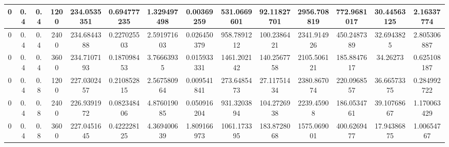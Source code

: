 \documentclass[main.tex]{subfiles}
\begin{document}
\begin{table}[ht]
\begin{tabular}{cccccccccccccc}
		\multicolumn{1}{|c|}{0}  & \multicolumn{1}{c|}{0.4} & \multicolumn{1}{c|}{0.4} & \multicolumn{1}{c|}{1200} & \multicolumn{1}{c|}{234.0535351} & \multicolumn{1}{c|}{0.694777235} & \multicolumn{1}{c|}{1.329497498} & \multicolumn{1}{c|}{0.00369259}  & \multicolumn{1}{c|}{531.0669601} & \multicolumn{1}{c|}{92.11827701} & \multicolumn{1}{c|}{2956.708819} & \multicolumn{1}{c|}{772.9681017} & \multicolumn{1}{c|}{30.44563125} & \multicolumn{1}{c|}{2.16337774}  \\ \hline
		\multicolumn{1}{|c|}{0}  & \multicolumn{1}{c|}{0.4} & \multicolumn{1}{c|}{0.4} & \multicolumn{1}{c|}{2400} & \multicolumn{1}{c|}{234.6844388} & \multicolumn{1}{c|}{0.227025503} & \multicolumn{1}{c|}{2.591971603} & \multicolumn{1}{c|}{0.026450379} & \multicolumn{1}{c|}{958.7891212} & \multicolumn{1}{c|}{100.2386421} & \multicolumn{1}{c|}{2341.914926} & \multicolumn{1}{c|}{450.2487389} & \multicolumn{1}{c|}{32.6943825}  & \multicolumn{1}{c|}{2.805306887} \\ \hline
		\multicolumn{1}{|c|}{0}  & \multicolumn{1}{c|}{0.4} & \multicolumn{1}{c|}{0.4} & \multicolumn{1}{c|}{3600} & \multicolumn{1}{c|}{234.7107193} & \multicolumn{1}{c|}{0.187098453} & \multicolumn{1}{c|}{3.76663935}  & \multicolumn{1}{c|}{0.015933331} & \multicolumn{1}{c|}{1461.202142} & \multicolumn{1}{c|}{140.2567758} & \multicolumn{1}{c|}{2105.506121} & \multicolumn{1}{c|}{185.8847617} & \multicolumn{1}{c|}{34.26273}    & \multicolumn{1}{c|}{0.625108187} \\ \hline
		\multicolumn{1}{|c|}{0}  & \multicolumn{1}{c|}{0.4} & \multicolumn{1}{c|}{0.8} & \multicolumn{1}{c|}{1200} & \multicolumn{1}{c|}{227.0302457} & \multicolumn{1}{c|}{0.210852815} & \multicolumn{1}{c|}{2.567580964} & \multicolumn{1}{c|}{0.009541841} & \multicolumn{1}{c|}{273.6485473} & \multicolumn{1}{c|}{27.11751434} & \multicolumn{1}{c|}{2380.867074} & \multicolumn{1}{c|}{220.0968557} & \multicolumn{1}{c|}{36.66573375} & \multicolumn{1}{c|}{0.284992722} \\ \hline
		\multicolumn{1}{|c|}{0}  & \multicolumn{1}{c|}{0.4} & \multicolumn{1}{c|}{0.8} & \multicolumn{1}{c|}{2400} & \multicolumn{1}{c|}{226.9391972} & \multicolumn{1}{c|}{0.082348406} & \multicolumn{1}{c|}{4.876019085} & \multicolumn{1}{c|}{0.050916204} & \multicolumn{1}{c|}{931.3203894} & \multicolumn{1}{c|}{104.2726938} & \multicolumn{1}{c|}{2239.45908}  & \multicolumn{1}{c|}{186.0534761} & \multicolumn{1}{c|}{39.10768667} & \multicolumn{1}{c|}{1.170063429} \\ \hline
		\multicolumn{1}{|c|}{0}  & \multicolumn{1}{c|}{0.4} & \multicolumn{1}{c|}{0.8} & \multicolumn{1}{c|}{3600} & \multicolumn{1}{c|}{227.0451645} & \multicolumn{1}{c|}{0.422228125} & \multicolumn{1}{c|}{4.369400639} & \multicolumn{1}{c|}{1.809166973} & \multicolumn{1}{c|}{1061.173395} & \multicolumn{1}{c|}{183.8728068} & \multicolumn{1}{c|}{1575.069001} & \multicolumn{1}{c|}{400.6269477} & \multicolumn{1}{c|}{17.94386875} & \multicolumn{1}{c|}{1.00654767}  \\ \hline

\end{tabular}
\end{table}
\end{document}
